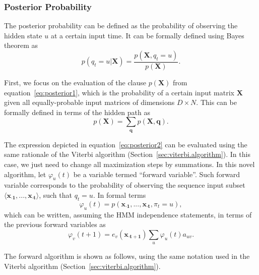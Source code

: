 \subsubsection{Posterior Probability}
\label{sec:posterior.probability}

The posterior probability can be defined as the probability of observing the hidden state $ u $ at a certain input time. It can be formally defined using Bayes theorem as
\begin{equation}
  \label{eq:posterior1}
  p(q_t = u | \mathbf{X}) = \frac{p(\mathbf{X}, q_t = u)}{p(\mathbf{X})}.
\end{equation}

First, we focus on the evaluation of the clause $ p(\mathbf{X}) $ from equation~\ref{eq:posterior1}, which is the probability of a certain input matrix $ \mathbf{X} $ given all equally-probable input matrices of dimensions $ D \times N $. This can be formally defined in terms of the hidden path as
\begin{equation}
  \label{eq:posterior2}
  p(\mathbf{X}) = \sum_{\mathbf{q}} p(\mathbf{X},\mathbf{q}).
\end{equation}

The expression depicted in equation~\ref{eq:posterior2} can be evaluated using the same rationale of the Viterbi algorithm (Section~\ref{sec:viterbi.algorithm}). In this case, we just need to change all maximization steps by summations. In this novel algorithm, let $ \varphi_u(t) $ be a variable termed ``forward variable''. Such forward variable corresponds to the probability of observing the sequence input subset $ \langle \mathbf{{x}_{\cdot 1}}, ..., \mathbf{{x}_{\cdot t}} \rangle $, such that $ q_t = u $. In formal terms
\begin{equation}
  \label{eq:posterior3}
  \varphi_u(t) = p(\mathbf{{x}_{\cdot 1}}, ..., \mathbf{{x}_{\cdot t}}, \pi_t = u),
\end{equation}
which can be written, assuming the HMM independence statements, in terms of the previous forward variables as
\begin{equation}
  \label{eq:posterior4}
  \varphi_v(t+1) = e_v(\mathbf{{x}_{\cdot t+1}}) \sum_{u}{\varphi_u(t) a_{uv}}.
\end{equation}

The forward algorithm is shown as follows, using the same notation used in the Viterbi algorithm (Section~\ref{sec:viterbi.algorithm}).

